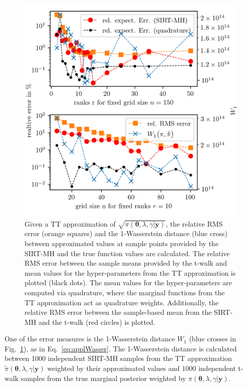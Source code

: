 \begin{figure}[ht!]
	\centering%
	\includegraphics[]{findGridRank.png}
	\caption[Optimal rank and number of grid points for TT approximation.]{Given a TT approximation of $\sqrt{\pi( \bm{\theta},\lambda,\gamma  | \bm{y}) }$, the relative RMS error (orange squares) and the 1-Wasserstein distance (blue cross) between approximated values at sample points provided by the SIRT-MH and the true function values are calculated. The relative RMS error between the sample means provided by the t-walk and mean values for the hyper-parameters from the TT approximation is plotted (black dots). The mean values for the hyper-parameters are computed via quadrature, where the marginal functions from the TT approximation act as quadrature weights. Additionally, the relative RMS error between the sample-based mean from the SIRT-MH and the t-walk (red circles) is plotted.}
	\label{fig:FindRankGrid}
\end{figure}
\clearpage
One of the error measures is the 1-Wasserstein distance $W_1$ (blue crosses in Fig.~\ref{fig:FindRankGrid}), as in Eq.~\ref{eq:applWasser}.
The 1-Wasserstein distance is calculated between 1000 independent SIRT-MH samples from the TT approximation $\tilde{\pi}( \bm{\theta},\lambda,\gamma  | \bm{y})$ weighted by their approximated values and 1000 independent t-walk samples from the true marginal posterior weighted by $\pi( \bm{\theta},\lambda,\gamma  | \bm{y})$.
